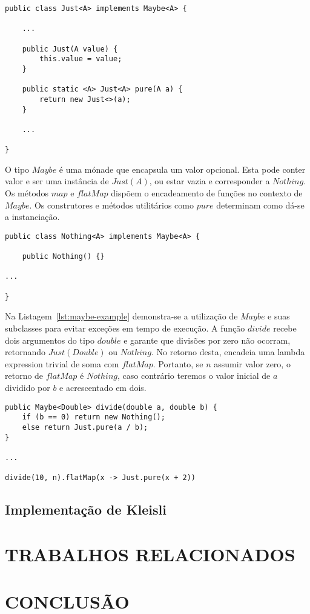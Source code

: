 \documentclass[10pt, conference]{IEEEtran}
\begin{document}
\begin{lstlisting}[caption = {Classe $Just$}, label = {lst:just-class}]
public class Just<A> implements Maybe<A> {

	...

	public Just(A value) {
		this.value = value;
	}

	public static <A> Just<A> pure(A a) {
		return new Just<>(a);
	}
    
	...

}
\end{lstlisting}

O tipo $Maybe$ é uma mónade que encapsula um valor opcional. Esta pode conter valor e ser uma instância de $Just(A)$, ou estar vazia e corresponder a $Nothing$. Os métodos $map$ e $flatMap$ dispõem o encadeamento de funções no contexto de $Maybe$. Os construtores e métodos utilitários  como $pure$ determinam como dá-se a instanciação.

\begin{lstlisting}[caption = {Classe $Nothing$}, label = {lst:nothing-class}]
public class Nothing<A> implements Maybe<A> {

	public Nothing() {}
    
...

}
\end{lstlisting}

Na Listagem~\ref{lst:maybe-example} demonstra-se a utilização de $Maybe$ e suas subclasses para evitar exceções em tempo de execução. A função $divide$ recebe dois argumentos do tipo $double$ e garante que divisões por zero não ocorram, retornando $Just(Double)$ ou $Nothing$. No retorno desta,  encadeia uma lambda expression trivial de soma com $flatMap$. Portanto, se $n$ assumir valor zero, o retorno de $flatMap$ é $Nothing$, caso contrário teremos o valor inicial de $a$ dividido por $b$ e acrescentado em dois.

\begin{lstlisting}[caption = {Exemplo de utilização de $Maybe$}, label = {lst:maybe-example}]
public Maybe<Double> divide(double a, double b) {
	if (b == 0) return new Nothing();
	else return Just.pure(a / b);
}

...

divide(10, n).flatMap(x -> Just.pure(x + 2))
\end{lstlisting}

\subsection{Implementação de Kleisli}

\section{TRABALHOS RELACIONADOS}

\section{CONCLUSÃO}



\end{document}
